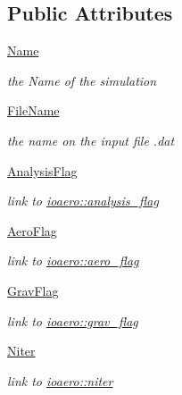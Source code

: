 \subsection*{Public Attributes}
\begin{DoxyCompactItemize}
\item 
\hyperlink{classgebtaero_1_1_input_file_1_1_input_file_a87afcf626898dba8987e1cee7c4b4ed2}{Name}
\begin{DoxyCompactList}\small\item\em the Name of the simulation \end{DoxyCompactList}\item 
\hyperlink{classgebtaero_1_1_input_file_1_1_input_file_a3bb9731a3c44faaf460cb16078183f92}{File\+Name}
\begin{DoxyCompactList}\small\item\em the name on the input file .dat \end{DoxyCompactList}\item 
\hyperlink{classgebtaero_1_1_input_file_1_1_input_file_a5e345411ff4b135151d46eaa96fd5b82}{Analysis\+Flag}
\begin{DoxyCompactList}\small\item\em link to \hyperlink{namespaceioaero_a435527b09d62e7aac9883e1a6d6f3438}{ioaero\+::analysis\+\_\+flag} \end{DoxyCompactList}\item 
\hyperlink{classgebtaero_1_1_input_file_1_1_input_file_ad55254b6742bec2601372089bb1f96c4}{Aero\+Flag}
\begin{DoxyCompactList}\small\item\em link to \hyperlink{namespaceioaero_afb280b6ca8de323c9a07076df81a71e1}{ioaero\+::aero\+\_\+flag} \end{DoxyCompactList}\item 
\hyperlink{classgebtaero_1_1_input_file_1_1_input_file_af8b6db9b44fda4dcd69858c0ae6675d2}{Grav\+Flag}
\begin{DoxyCompactList}\small\item\em link to \hyperlink{namespaceioaero_a831fe87d45ef05e3e29a8c4c2fc88c8f}{ioaero\+::grav\+\_\+flag} \end{DoxyCompactList}\item 
\hyperlink{classgebtaero_1_1_input_file_1_1_input_file_af663735f2e6dc4753c51e27ca4a7cbc6}{Niter}
\begin{DoxyCompactList}\small\item\em link to \hyperlink{namespaceioaero_ac008486fd12e0029a1ef77b3ca5e12c3}{ioaero\+::niter} \end{DoxyCompactList}\item 

\end{DoxyCompactItemize}
